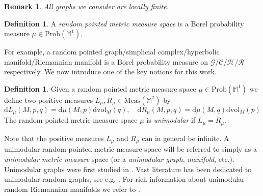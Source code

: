 \documentclass{amsart}
\newcommand{\dd}{\mathrm{d}}
\newcommand{\MM}{\mathbb{M}}
\newcommand{\Graphs}{\mathcal{G}}
\newcommand{\Complexes}{\mathcal{C}}
\newcommand{\Hypers}{\mathcal{H}}
\newcommand{\Riemanns}{\mathcal{R}}
\newcommand{\vol}{\mathrm{vol}}
\newcommand{\Prob}[1]{\mathrm{Prob}\left(#1\right)}
\theoremstyle{plain}
\newtheorem{remark}[theorem]{Remark}
\numberwithin{equation}{section}
\theoremstyle{definition}
\newtheorem{definition}[theorem]{Definition}
\begin{document}
\begin{remark}
All graphs we consider are locally finite.
\end{remark}

\begin{definition}
A \emph{random pointed metric measure space} is a Borel probability measure $\mu \in \Prob{\MM^1}$.
\end{definition}

For example, a random pointed graph/simplicial complex/hyperbolic manifold/Riemannian manifold is a Borel probability measure on $\Graphs$/$\Complexes$/$\Hypers$/$\Riemanns$ respectively.    
We now introduce one of the key notions for this work.

\begin{definition}
Given a random pointed metric measure space $\mu \in \Prob{\MM^1}$ we define two positive measures $L_\mu,R_\mu \in \mathrm{Meas}(\MM^2)$ by
\begin{equation}
\dd L_\mu(M,p,q) = \dd \mu(M,p) \dd \vol_M(q), \quad \dd R_\mu(M,p,q) = \dd \mu(M,q) \dd \vol_M(p)
\end{equation}
The random pointed metric measure space $\mu$ is \emph{unimodular} if $L_\mu = R_\mu$.
\end{definition}

Note that the positive measures $L_\mu$ and $R_\mu $ can in general be infinite.
A unimodular random pointed metric measure space will be referred to simply as a \emph{unimodular metric measure} space (or a \emph{unimodular graph}, \emph{manifold}, etc.). Unimodular graphs were first studied in \cite{aldous2007processes}. Vast literature has been dedicated to unimodular random graphs, see e.g. \cite{benjamini2012ergodic, BENJAMINI_LYONS_SCHRAMM_2015,salez2020spectral,lee2023relations,van2024number}. For rich information about unimodular random Riemannian manifolds we refer to \cite{abert2022unimodular}.
\end{document}
